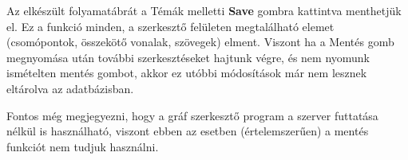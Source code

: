 
Az elkészült folyamatábrát a Témák melletti \textbf{Save} gombra kattintva menthetjük el. Ez a funkció minden, a szerkesztő felületen megtalálható elemet (csomópontok, összekötő vonalak, szövegek) elment. Viszont ha a Mentés gomb megnyomása után további szerkesztéseket hajtunk végre, és nem nyomunk ismételten mentés gombot, akkor ez utóbbi módosítások már nem lesznek eltárolva az adatbázisban.

Fontos még megjegyezni, hogy a gráf szerkesztő program a szerver futtatása nélkül is használható, viszont ebben az esetben (értelemszerűen) a mentés funkciót nem tudjuk használni.